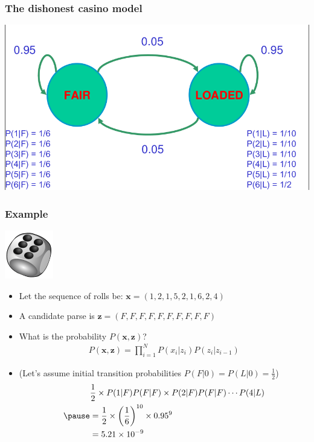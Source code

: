\documentclass[usenames,dvipsnames]{beamer}
\newcommand{\x}{\mathbf{x}}
\newcommand{\z}{\mathbf{z}}
\newcommand{\voc}[1]{{\color{ForestGreen}#1}}
\begin{document}
 \begin{frame}
   \frametitle{The dishonest casino model}
   \begin{center}
     \includegraphics[scale=0.4]{dishonest-casino.png}
   \end{center}
 \end{frame}

 \begin{frame}
   \frametitle{Example}
\vskip -0.8cm
\hskip 9cm \includegraphics{dice.png}
\begin{itemize}
\item Let the sequence of rolls be:
  $\x = (1,2,1,5,2,1,6,2,4)$
\item A candidate \voc{parse} is $\z = (F,F,F,F,F,F,F,F,F,F)$
\item What is the probability $P(\x,\z)$?
  \begin{align*}
     P(\x,\z) = \prod_{i=1}^N P(x_i|z_{i})
                         P(z_i|z_{i-1})
  \end{align*}
\item (Let's assume initial transition probabilities $P(F|0) = P(L|0)
  = \frac{1}{2}$)
\pause
  \begin{align*}
    & \frac{1}{2} \times P(1|F)P(F|F) \times P(2|F) P(F|F) \cdots
    P(4|L)\\
\pause
    & = \frac{1}{2} \times \left(\frac{1}{6}\right)^{10} \times 0.95^9\\
    & = 5.21 \times 10^{-9}
  \end{align*}
\end{itemize}
 \end{frame}
\end{document}
